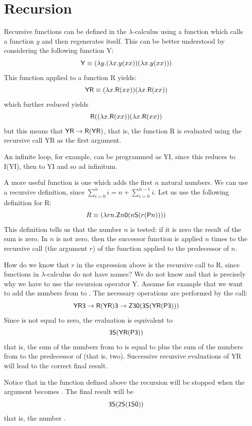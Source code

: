 \documentclass[12pt]{article}
\begin{document}
\section{Recursion}
Recursive functions can be defined in the $\lambda$-calculus using a function which calls a function $y$ and then regenerates itself. This can be better understood by considering the following function {\sf Y}:
$${\sf Y}\equiv (\lambda y.(\lambda x.y(xx))(\lambda x.y(xx)))$$
This function applied to a function {\sf R} yields:
$${\sf YR}\equiv (\lambda x.{\sf R}(xx))(\lambda x.{\sf R}(xx))$$ which further reduced yields
$${\sf R}((\lambda x.{\sf R}(xx))(\lambda x.{\sf R}(xx))$$ 
but this means that ${\sf YR}\rightarrow{\sf R}({\sf YR})$, that is, the function {\sf R} is evaluated using the recursive call {\sf YR} as the first argument.

An infinite loop, for example, can be programmed as {\sf YI}, since this reduces to {\sf I}({\sf YI}), then to {\sf YI} and so ad infinitum.

A more useful function is one which adds the first $n$ natural numbers. We can use a recursive definition, since $\sum^{n}_{i=0}i=n + \sum^{n-1}_{i=0}i$. Let us use the following definition for {\sf R}:
$$R\equiv (\lambda rn.{\sf Z} n{\sf 0}(n{\sf S}(r({\sf P}n))))$$ This definition tells us that the number $n$ is tested: if it is zero the result of the sum is zero. In $n$ is not zero, then the successor function is applied $n$ times to the recursive call (the argument $r$) of the function applied to the predecessor of $n$.

How do we know that $r$ in the expression above is the recursive call to {\sf R}, since functions in $\lambda$-calculus do not have names? We do not know and that is precisely why we have to use the recursion operator {\sf Y}. Assume for example that we want to add the numbers  from {} to {}. The necessary operations are performed by the call:
$${\sf YR3} \rightarrow  {\sf R}({\sf YR}){\sf 3} \rightarrow {\sf Z30}({\sf 3S}({\sf YR}({\sf P3})))$$ 
Since {} is not equal to zero, the evaluation is equivalent to $${\sf 3S}({\sf YR({\sf P3})})$$ that is, the sum of the numbers from {} to {} is equal to {} plus the sum of the numbers from {} to the predecessor of {} (that is, two). Successive recursive evaluations of {\sf YR} will lead to the correct final result. 

Notice that in the function defined above the recursion will be stopped when the argument becomes {}. The final result will be
$$
{\sf 3S}({\sf 2S}({\sf 1S0}))
$$
that is, the number {}.
\end{document}
